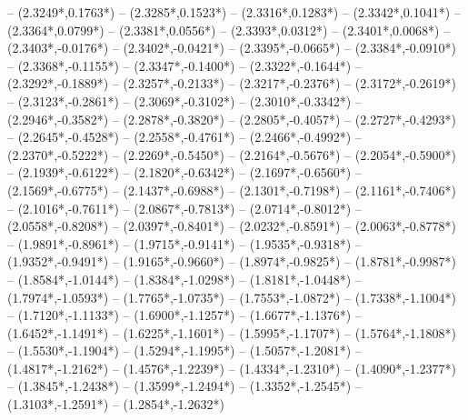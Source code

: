 {	-- ({2.3249*\dx},{0.1763*\dy})
	-- ({2.3285*\dx},{0.1523*\dy})
	-- ({2.3316*\dx},{0.1283*\dy})
	-- ({2.3342*\dx},{0.1041*\dy})
	-- ({2.3364*\dx},{0.0799*\dy})
	-- ({2.3381*\dx},{0.0556*\dy})
	-- ({2.3393*\dx},{0.0312*\dy})
	-- ({2.3401*\dx},{0.0068*\dy})
	-- ({2.3403*\dx},{-0.0176*\dy})
	-- ({2.3402*\dx},{-0.0421*\dy})
	-- ({2.3395*\dx},{-0.0665*\dy})
	-- ({2.3384*\dx},{-0.0910*\dy})
	-- ({2.3368*\dx},{-0.1155*\dy})
	-- ({2.3347*\dx},{-0.1400*\dy})
	-- ({2.3322*\dx},{-0.1644*\dy})
	-- ({2.3292*\dx},{-0.1889*\dy})
	-- ({2.3257*\dx},{-0.2133*\dy})
	-- ({2.3217*\dx},{-0.2376*\dy})
	-- ({2.3172*\dx},{-0.2619*\dy})
	-- ({2.3123*\dx},{-0.2861*\dy})
	-- ({2.3069*\dx},{-0.3102*\dy})
	-- ({2.3010*\dx},{-0.3342*\dy})
	-- ({2.2946*\dx},{-0.3582*\dy})
	-- ({2.2878*\dx},{-0.3820*\dy})
	-- ({2.2805*\dx},{-0.4057*\dy})
	-- ({2.2727*\dx},{-0.4293*\dy})
	-- ({2.2645*\dx},{-0.4528*\dy})
	-- ({2.2558*\dx},{-0.4761*\dy})
	-- ({2.2466*\dx},{-0.4992*\dy})
	-- ({2.2370*\dx},{-0.5222*\dy})
	-- ({2.2269*\dx},{-0.5450*\dy})
	-- ({2.2164*\dx},{-0.5676*\dy})
	-- ({2.2054*\dx},{-0.5900*\dy})
	-- ({2.1939*\dx},{-0.6122*\dy})
	-- ({2.1820*\dx},{-0.6342*\dy})
	-- ({2.1697*\dx},{-0.6560*\dy})
	-- ({2.1569*\dx},{-0.6775*\dy})
	-- ({2.1437*\dx},{-0.6988*\dy})
	-- ({2.1301*\dx},{-0.7198*\dy})
	-- ({2.1161*\dx},{-0.7406*\dy})
	-- ({2.1016*\dx},{-0.7611*\dy})
	-- ({2.0867*\dx},{-0.7813*\dy})
	-- ({2.0714*\dx},{-0.8012*\dy})
	-- ({2.0558*\dx},{-0.8208*\dy})
	-- ({2.0397*\dx},{-0.8401*\dy})
	-- ({2.0232*\dx},{-0.8591*\dy})
	-- ({2.0063*\dx},{-0.8778*\dy})
	-- ({1.9891*\dx},{-0.8961*\dy})
	-- ({1.9715*\dx},{-0.9141*\dy})
	-- ({1.9535*\dx},{-0.9318*\dy})
	-- ({1.9352*\dx},{-0.9491*\dy})
	-- ({1.9165*\dx},{-0.9660*\dy})
	-- ({1.8974*\dx},{-0.9825*\dy})
	-- ({1.8781*\dx},{-0.9987*\dy})
	-- ({1.8584*\dx},{-1.0144*\dy})
	-- ({1.8384*\dx},{-1.0298*\dy})
	-- ({1.8181*\dx},{-1.0448*\dy})
	-- ({1.7974*\dx},{-1.0593*\dy})
	-- ({1.7765*\dx},{-1.0735*\dy})
	-- ({1.7553*\dx},{-1.0872*\dy})
	-- ({1.7338*\dx},{-1.1004*\dy})
	-- ({1.7120*\dx},{-1.1133*\dy})
	-- ({1.6900*\dx},{-1.1257*\dy})
	-- ({1.6677*\dx},{-1.1376*\dy})
	-- ({1.6452*\dx},{-1.1491*\dy})
	-- ({1.6225*\dx},{-1.1601*\dy})
	-- ({1.5995*\dx},{-1.1707*\dy})
	-- ({1.5764*\dx},{-1.1808*\dy})
	-- ({1.5530*\dx},{-1.1904*\dy})
	-- ({1.5294*\dx},{-1.1995*\dy})
	-- ({1.5057*\dx},{-1.2081*\dy})
	-- ({1.4817*\dx},{-1.2162*\dy})
	-- ({1.4576*\dx},{-1.2239*\dy})
	-- ({1.4334*\dx},{-1.2310*\dy})
	-- ({1.4090*\dx},{-1.2377*\dy})
	-- ({1.3845*\dx},{-1.2438*\dy})
	-- ({1.3599*\dx},{-1.2494*\dy})
	-- ({1.3352*\dx},{-1.2545*\dy})
	-- ({1.3103*\dx},{-1.2591*\dy})
	-- ({1.2854*\dx},{-1.2632*\dy})
}
